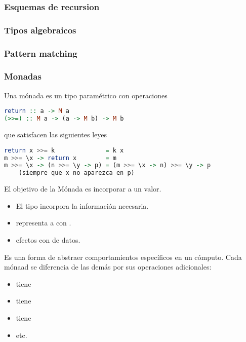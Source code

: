 \subsubsection{Esquemas de recursion}

\subsubsection{Tipos algebraicos}

\subsubsection{Pattern matching}

\subsubsection{Monadas}

Una mónada es un tipo paramétrico  con operaciones

\begin{lstlisting}[language=Haskell]
return :: a -> M a
(>>=) :: M a -> (a -> M b) -> M b
\end{lstlisting}

que satisfacen las siguientes leyes

\begin{lstlisting}[language=Haskell]
return x >>= k              = k x
m >>= \x -> return x        = m
m >>= \x -> (n >>= \y -> p) = (m >>= \x -> n) >>= \y -> p
    (siempre que x no aparezca en p)
\end{lstlisting}

El objetivo de la Mónada es incorporar  a un valor.
\begin{itemize}
  \item El tipo  incorpora la información necesaria.
  \item {} representa a  con .
  \item \xtt{(>>=)}  efectos con  de datos.
\end{itemize}

Es una forma de abstraer comportamientos específicos en un cómputo. Cada mónaad se diferencia de las demás por sus operaciones adicionales:
\begin{itemize}
  \item {} tiene 
  \item {} tiene 
  \item {} tiene 
  \item etc.
\end{itemize}

